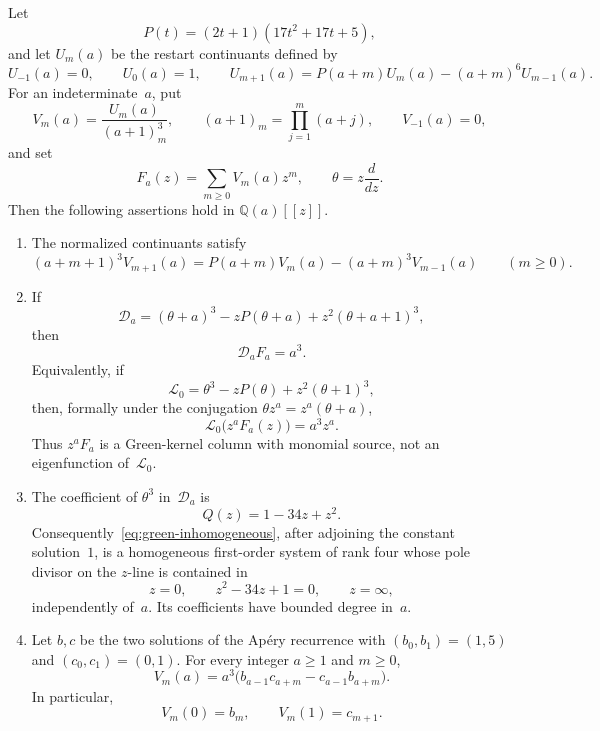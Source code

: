\begin{proposition}
\label{prop:gap-kernel-green}
Let
\[
 P(t)=(2t+1)(17t^2+17t+5),
\]
and let $U_m(a)$ be the restart continuants defined by
\[
 U_{-1}(a)=0,\qquad U_0(a)=1,\qquad
 U_{m+1}(a)=P(a+m)U_m(a)-(a+m)^6U_{m-1}(a).
\]
For an indeterminate~$a$, put
\[
 V_m(a)=\frac{U_m(a)}{(a+1)_m^3},\qquad
 (a+1)_m=\prod_{j=1}^m(a+j),\qquad V_{-1}(a)=0,
\]
and set
\[
 F_a(z)=\sum_{m\geq0}V_m(a)z^m,
 \qquad \theta=z\frac{d}{dz}.
\]
Then the following assertions hold in $\mathbb Q(a)[[z]]$.

\begin{enumerate}
\item The normalized continuants satisfy
\begin{equation}
 (a+m+1)^3V_{m+1}(a)
 =P(a+m)V_m(a)-(a+m)^3V_{m-1}(a)
 \qquad(m\geq0).
 \label{eq:green-normalized-recurrence}
\end{equation}

\item If
\begin{equation}
 \mathscr D_a
 = (\theta+a)^3-zP(\theta+a)
   +z^2(\theta+a+1)^3,
 \label{eq:green-operator}
\end{equation}
then
\begin{equation}
 \boxed{\mathscr D_aF_a=a^3.}
 \label{eq:green-inhomogeneous}
\end{equation}
Equivalently, if
\[
 \mathscr L_0=\theta^3-zP(\theta)+z^2(\theta+1)^3,
\]
then, formally under the conjugation
$\theta z^a=z^a(\theta+a)$,
\begin{equation}
 \boxed{\mathscr L_0\bigl(z^aF_a(z)\bigr)=a^3z^a.}
 \label{eq:green-conjugated}
\end{equation}
Thus $z^aF_a$ is a Green-kernel column with monomial source, not an
eigenfunction of~$\mathscr L_0$.

\item The coefficient of $\theta^3$ in~$\mathscr D_a$ is
\[
 Q(z)=1-34z+z^2.
\]
Consequently~\eqref{eq:green-inhomogeneous}, after adjoining the constant
solution~$1$, is a homogeneous first-order system of rank four whose pole
divisor on the $z$-line is contained in
\begin{equation}
 z=0,\qquad z^2-34z+1=0,\qquad z=\infty,
 \label{eq:green-singular-divisor}
\end{equation}
independently of~$a$.  Its coefficients have bounded degree in~$a$.

\item Let $b,c$ be the two solutions of the Ap\'ery recurrence with
$(b_0,b_1)=(1,5)$ and $(c_0,c_1)=(0,1)$.  For every integer $a\geq1$ and
$m\geq0$,
\begin{equation}
 \boxed{
 V_m(a)=a^3\bigl(b_{a-1}c_{a+m}-c_{a-1}b_{a+m}\bigr).}
 \label{eq:green-casoratian}
\end{equation}
In particular,
\[
 V_m(0)=b_m,\qquad V_m(1)=c_{m+1}.
\]
\end{enumerate}
\end{proposition}

